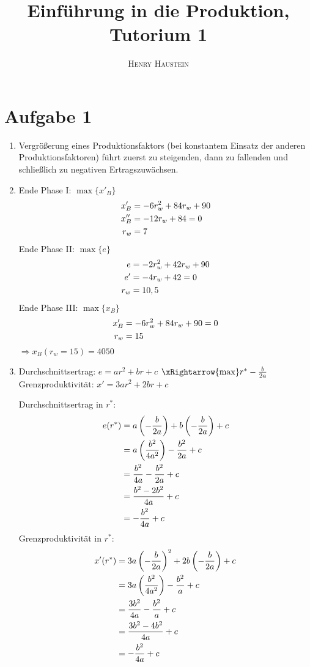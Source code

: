 \documentclass{article}
\title{\textbf{Einführung in die Produktion, Tutorium 1}}
\author{\textsc{Henry Haustein}}
\date{}
\begin{document}
	\maketitle
	
	\section*{Aufgabe 1}
	\begin{enumerate}[label=(\alph*)]
		\item Vergrößerung eines Produktionsfaktors (bei konstantem Einsatz der anderen Produktionsfaktoren) führt zuerst zu steigenden, dann zu fallenden und schließlich zu negativen Ertragszuwächsen.
		\item Ende Phase I: $\max\{x'_B\}$
		\begin{align}
			x'_B &= -6r_w^2 + 84r_w + 90 \notag \\
			x''_B &= -12r_w + 84 = 0 \notag \\
			r_w &= 7 \notag
		\end{align}
		Ende Phase II: $\max\{e\}$
		\begin{align}
			e &= -2r_w^2 + 42r_w + 90 \notag \\
			e' &= -4r_w + 42  = 0 \notag \\
			r_w &= 10,5 \notag
		\end{align}
		Ende Phase III: $\max\{x_B\}$
		\begin{align}
			x'_B &= -6r_w^2 + 84r_w + 90 = 0 \notag \\
			r_w &= 15 \notag
		\end{align}
		$\Rightarrow x_B(r_w = 15) = 4050$
		\item Durchschnittsertrag: $e=ar^2 + br + c$ $\xRightarrow{\max} r^\ast -\frac{b}{2a}$ \\
		Grenzproduktivität: $x'=3ar^2 + 2br + c$
		
		Durchschnittsertrag in $r^\ast$:
		\begin{align}
			e(r^\ast) &= a\left(-\frac{b}{2a}\right) + b\left(-\frac{b}{2a}\right) + c \notag \\
			&= a\left(\frac{b^2}{4a^2}\right) - \frac{b^2}{2a} + c \notag \\
			&= \frac{b^2}{4a} - \frac{b^2}{2a} + c \notag \\
			&= \frac{b^2-2b^2}{4a} + c \notag \\
			&= -\frac{b^2}{4a}+c \notag
		\end{align}
		Grenzproduktivität in $r^\ast$:
		\begin{align}
			x'(r^\ast) &= 3a\left(-\frac{b}{2a}\right)^2 + 2b\left(-\frac{b}{2a}\right) + c \notag \\
			&= 3a\left(\frac{b^2}{4a^2}\right) - \frac{b^2}{a} + c \notag \\
			&= \frac{3b^2}{4a} - \frac{b^2}{a} + c \notag \\
			&= \frac{3b^2-4b^2}{4a} + c \notag \\
			&= -\frac{b^2}{4a} + c \notag
		\end{align}
	\end{enumerate}
\end{document}
